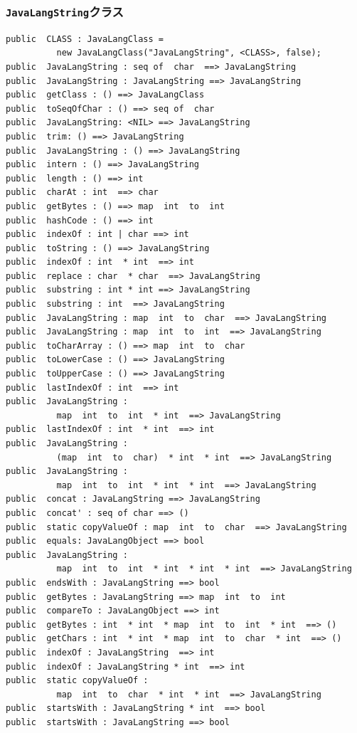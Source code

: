 \documentclass[\pformat,12pt]{jarticle}
\begin{document}
\subsubsection{\texttt{JavaLangString}クラス}
\begin{small}
\begin{verbatim}
public  CLASS : JavaLangClass =
          new JavaLangClass("JavaLangString", <CLASS>, false);
public  JavaLangString : seq of  char  ==> JavaLangString
public  JavaLangString : JavaLangString ==> JavaLangString
public  getClass : () ==> JavaLangClass
public  toSeqOfChar : () ==> seq of  char
public  JavaLangString: <NIL> ==> JavaLangString
public  trim: () ==> JavaLangString
public  JavaLangString : () ==> JavaLangString
public  intern : () ==> JavaLangString
public  length : () ==> int
public  charAt : int  ==> char
public  getBytes : () ==> map  int  to  int
public  hashCode : () ==> int
public  indexOf : int | char ==> int
public  toString : () ==> JavaLangString
public  indexOf : int  * int  ==> int
public  replace : char  * char  ==> JavaLangString
public  substring : int * int ==> JavaLangString
public  substring : int  ==> JavaLangString
public  JavaLangString : map  int  to  char  ==> JavaLangString
public  JavaLangString : map  int  to  int  ==> JavaLangString
public  toCharArray : () ==> map  int  to  char
public  toLowerCase : () ==> JavaLangString
public  toUpperCase : () ==> JavaLangString
public  lastIndexOf : int  ==> int
public  JavaLangString : 
          map  int  to  int  * int  ==> JavaLangString
public  lastIndexOf : int  * int  ==> int
public  JavaLangString : 
          (map  int  to  char)  * int  * int  ==> JavaLangString
public  JavaLangString : 
          map  int  to  int  * int  * int  ==> JavaLangString
public  concat : JavaLangString ==> JavaLangString
public  concat' : seq of char ==> ()
public  static copyValueOf : map  int  to  char  ==> JavaLangString
public  equals: JavaLangObject ==> bool
public  JavaLangString : 
          map  int  to  int  * int  * int  * int  ==> JavaLangString
public  endsWith : JavaLangString ==> bool
public  getBytes : JavaLangString ==> map  int  to  int
public  compareTo : JavaLangObject ==> int
public  getBytes : int  * int  * map  int  to  int  * int  ==> ()
public  getChars : int  * int  * map  int  to  char  * int  ==> ()
public  indexOf : JavaLangString  ==> int
public  indexOf : JavaLangString * int  ==> int
public  static copyValueOf : 
          map  int  to  char  * int  * int  ==> JavaLangString
public  startsWith : JavaLangString * int  ==> bool
public  startsWith : JavaLangString ==> bool

\end{verbatim}
\end{small}
\end{document}

